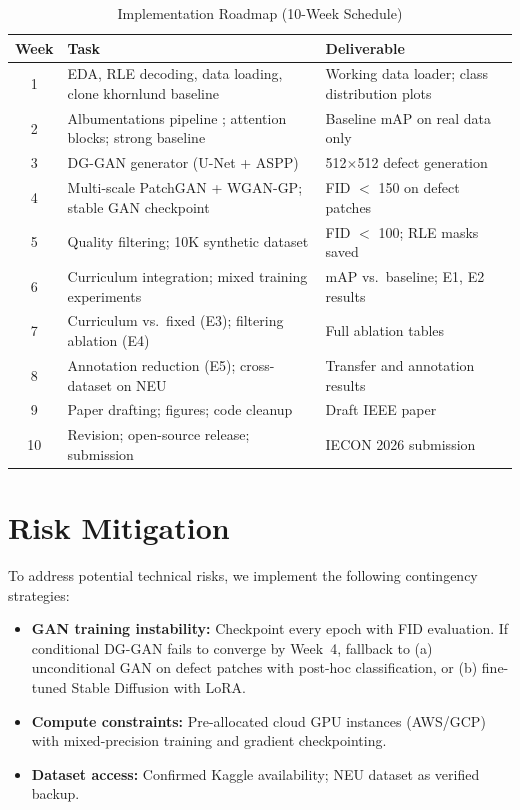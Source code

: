 \documentclass[conference]{IEEEtran}
\begin{document}
\begin{table}[h]
\centering
\caption{Implementation Roadmap (10-Week Schedule)}
\label{tab:timeline}
\renewcommand{\arraystretch}{1.2}
\begin{tabularx}{\columnwidth}{c X l}
\toprule
\textbf{Week} & \textbf{Task} & \textbf{Deliverable} \\
\midrule
1   & EDA, RLE decoding, data loading,
      clone khornlund baseline \cite{khornlund_repo}
    & Working data loader; class distribution plots \\
2   & Albumentations pipeline \cite{diyago_repo};
      attention blocks; strong baseline
    & Baseline mAP on real data only \\
3   & DG-GAN generator (U-Net + ASPP)
    & 512$\times$512 defect generation \\
4   & Multi-scale PatchGAN + WGAN-GP;
      stable GAN checkpoint
    & FID $<$ 150 on defect patches \\
5   & Quality filtering; 10K synthetic dataset
    & FID $<$ 100; RLE masks saved \\
6   & Curriculum integration;
      mixed training experiments
    & mAP vs.\ baseline; E1, E2 results \\
7   & Curriculum vs.\ fixed (E3);
      filtering ablation (E4)
    & Full ablation tables \\
8   & Annotation reduction (E5);
      cross-dataset on NEU
    & Transfer and annotation results \\
9   & Paper drafting; figures; code cleanup
    & Draft IEEE paper \\
10  & Revision; open-source release; submission
    & IECON 2026 submission \\
\bottomrule
\end{tabularx}
\end{table}

\section{Risk Mitigation}

To address potential technical risks, we implement the following
contingency strategies:

\begin{itemize}
    \item \textbf{GAN training instability:} Checkpoint every epoch
          with FID evaluation. If conditional DG-GAN fails to converge
          by Week~4, fallback to (a) unconditional GAN on defect patches
          with post-hoc classification, or (b) fine-tuned Stable
          Diffusion with LoRA.
    \item \textbf{Compute constraints:} Pre-allocated cloud GPU
          instances (AWS/GCP) with mixed-precision training and
          gradient checkpointing.
    \item \textbf{Dataset access:} Confirmed Kaggle availability;
          NEU dataset as verified backup.
\end{itemize}
\end{document}
